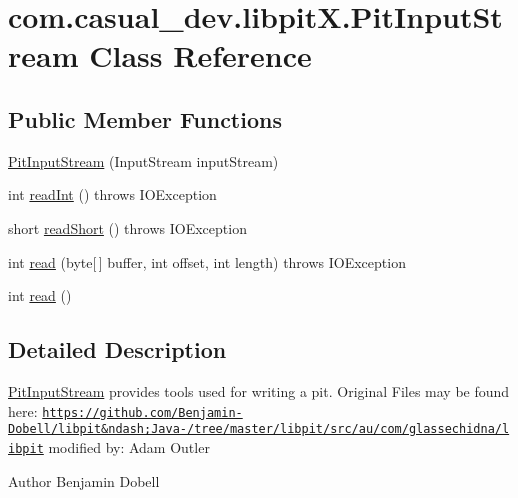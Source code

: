 \hypertarget{classcom_1_1casual__dev_1_1libpit_x_1_1_pit_input_stream}{\section{com.\-casual\-\_\-dev.\-libpit\-X.\-Pit\-Input\-Stream Class Reference}
\label{classcom_1_1casual__dev_1_1libpit_x_1_1_pit_input_stream}
}
\subsection*{Public Member Functions}
\begin{DoxyCompactItemize}
\item 
\hyperlink{classcom_1_1casual__dev_1_1libpit_x_1_1_pit_input_stream_a68d4bb2f70bdd57a6593dddc301a6575}{Pit\-Input\-Stream} (Input\-Stream input\-Stream)
\item 
int \hyperlink{classcom_1_1casual__dev_1_1libpit_x_1_1_pit_input_stream_a29529b12f4245d9f054e65f18f12ce3b}{read\-Int} ()  throws I\-O\-Exception 
\item 
short \hyperlink{classcom_1_1casual__dev_1_1libpit_x_1_1_pit_input_stream_ad3bc358d082b94fef6578161f71eb424}{read\-Short} ()  throws I\-O\-Exception 
\item 
int \hyperlink{classcom_1_1casual__dev_1_1libpit_x_1_1_pit_input_stream_a452e8741b4c760649254902ce16eabd5}{read} (byte\mbox{[}$\,$\mbox{]} buffer, int offset, int length)  throws I\-O\-Exception 
\item 
int \hyperlink{classcom_1_1casual__dev_1_1libpit_x_1_1_pit_input_stream_ad3aa4199ce3c0e731bf73eb81dc90204}{read} ()
\end{DoxyCompactItemize}


\subsection{Detailed Description}
\hyperlink{classcom_1_1casual__dev_1_1libpit_x_1_1_pit_input_stream}{Pit\-Input\-Stream} provides tools used for writing a pit. Original Files may be found here\-: \href{https://github.com/Benjamin-Dobell/libpit&ndash;Java-/tree/master/libpit/src/au/com/glassechidna/libpit}{\tt https\-://github.\-com/\-Benjamin-\/\-Dobell/libpit\&ndash;\-Java-\//tree/master/libpit/src/au/com/glassechidna/libpit} modified by\-: Adam Outler

\begin{DoxyAuthor}{Author}
Benjamin Dobell 
\end{DoxyAuthor}


